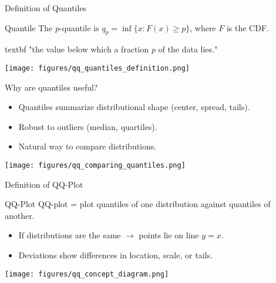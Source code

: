 \documentclass{beamer}
\newcommand{\1}{\mathbf{1}}
\newcommand{\robustcmd}[1]{\csname #1\endcsname}
\providecommand{\textbf}[1]{\robustcmd{textbf}{#1}}
\begin{document}
\begin{frame}{Definition of Quantiles}
  \begin{block}{Quantile}
    The $p$-quantile is $q_p = \inf \{x : F(x) \geq p \}$, where $F$ is the CDF.
  \end{block}
  \vspace{0.3em}
  \textbf{Intuition:} "the value below which a fraction $p$ of the data lies."
  \vspace{0.5em}
  \begin{center}
    \texttt{[image: figures/qq\_quantiles\_definition.png]}
  \end{center}
\end{frame}

\begin{frame}{Why are quantiles useful?}
  \begin{itemize}
    \item Quantiles summarize distributional shape (center, spread, tails).
    \item Robust to outliers (median, quartiles).
    \item Natural way to compare distributions.
  \end{itemize}
  \vspace{0.5em}
  \begin{center}
    \texttt{[image: figures/qq\_comparing\_quantiles.png]}
  \end{center}
\end{frame}

\begin{frame}{Definition of QQ-Plot}
  \begin{block}{QQ-Plot}
    QQ-plot = plot quantiles of one distribution against quantiles of another.
  \end{block}
  \vspace{0.3em}
  \begin{itemize}
    \item If distributions are the same $\rightarrow$ points lie on line $y=x$.
    \item Deviations show differences in location, scale, or tails.
  \end{itemize}
  \vspace{0.5em}
  \begin{center}
    \texttt{[image: figures/qq\_concept\_diagram.png]}
  \end{center}
\end{frame}
\end{document}
